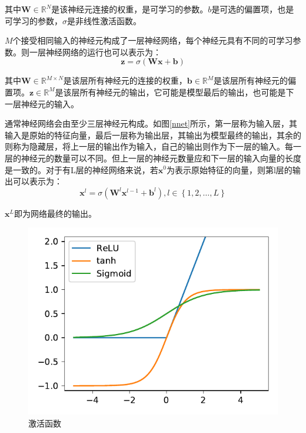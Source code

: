 其中$\bm{W}\in\mathbb{R}^N$是该神经元连接的权重，是可学习的参数。$b$是可选的偏置项，也是可学习的参数，$\sigma$是非线性激活函数。

$M$个接受相同输入的神经元构成了一层神经网络，每个神经元具有不同的可学习参数。则一层神经网络的运行也可以表示为：
\begin{equation}
    \bm{z}=\sigma\left(\bm{W}\bm{x}+\bm{b}\right)
\end{equation}

其中$\bm{W}\in\mathbb{R}^{M\times N}$是该层所有神经元的连接的权重，$\bm{b}\in\mathbb{R}^M$是该层所有神经元的偏置项。$\bm{z}\in\mathbb{R}^M$是该层所有神经元的输出，它可能是模型最后的输出，也可能是下一层神经元的输入。

通常神经网络会由至少三层神经元构成。如图\ref{nnet}所示，第一层称为输入层，其输入是原始的特征向量，最后一层称为输出层，其输出为模型最终的输出，其余的则称为隐藏层，将上一层的输出作为输入，自己的输出则作为下一层的输入。每一层的神经元的数量可以不同。但上一层的神经元数量应和下一层的输入向量的长度是一致的。对于有L层的神经网络来说，若$\bm{x}^0$为表示原始特征的向量，则第l层的输出可以表示为：
\begin{equation}
    \bm{x}^l=\sigma\left(\bm{W}^l\bm{x}^{l-1}+\bm{b}^l\right),l\in\left\{1,2,\ldots,L\right\}
\end{equation}

$\bm{x}^L$即为网络最终的输出。

\begin{figure}
    \centering
    \includegraphics{figure/act.pdf}
    \caption{激活函数}
    \label{act-func}
\end{figure}

